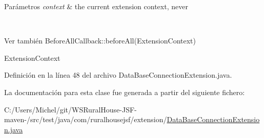 \begin{DoxyParams}{Parámetros}
{\em context} & the current extension context, never
\begin{DoxyCode}{1}
\DoxyCodeLine{\textcolor{keyword}{null} }
\end{DoxyCode}
\\
\hline
\end{DoxyParams}
\begin{DoxySeeAlso}{Ver también}
Before\+All\+Callback\+::before\+All(\+Extension\+Context) 

Extension\+Context 
\end{DoxySeeAlso}


Definición en la línea 48 del archivo Data\+Base\+Connection\+Extension.\+java.



La documentación para esta clase fue generada a partir del siguiente fichero\+:\begin{DoxyCompactItemize}
\item 
C\+:/\+Users/\+Michel/git/\+W\+S\+Rural\+House-\/\+J\+S\+F-\/maven-\//src/test/java/com/ruralhousejsf/extension/\mbox{\hyperlink{_data_base_connection_extension_8java}{Data\+Base\+Connection\+Extension.\+java}}\end{DoxyCompactItemize}
